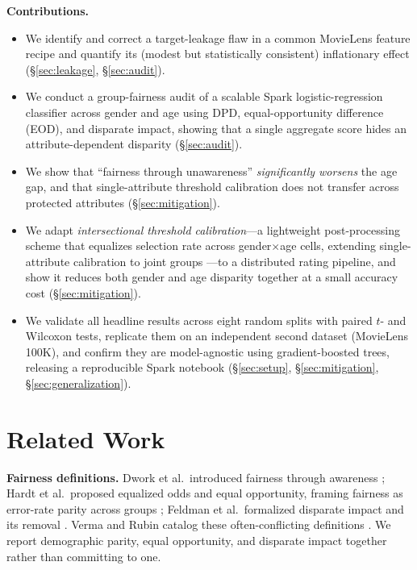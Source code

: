 \documentclass[conference]{IEEEtran}
\begin{document}
\textbf{Contributions.}
\begin{itemize}
  \item We identify and correct a target-leakage flaw in a common MovieLens
  feature recipe and quantify its (modest but statistically consistent) inflationary
  effect (\S\ref{sec:leakage}, \S\ref{sec:audit}).
  \item We conduct a group-fairness audit of a scalable Spark logistic-regression
  classifier across gender and age using DPD, equal-opportunity difference (EOD),
  and disparate impact, showing that a single aggregate score hides an
  attribute-dependent disparity (\S\ref{sec:audit}).
  \item We show that ``fairness through unawareness'' \emph{significantly worsens} the
  age gap, and that single-attribute threshold calibration does not transfer across
  protected attributes (\S\ref{sec:mitigation}).
  \item We adapt \emph{intersectional threshold calibration}---a lightweight
  post-processing scheme that equalizes selection rate across gender$\times$age cells,
  extending single-attribute calibration \cite{hardt2016equality} to joint groups
  \cite{foulds2020intersectional,kearns2018gerrymandering}---to a distributed rating
  pipeline, and show it reduces both gender and age disparity together at a small accuracy
  cost (\S\ref{sec:mitigation}).
  \item We validate all headline results across eight random splits with paired
  $t$- and Wilcoxon tests, replicate them on an independent second dataset
  (MovieLens 100K), and confirm they are model-agnostic using gradient-boosted trees,
  releasing a reproducible Spark notebook
  (\S\ref{sec:setup}, \S\ref{sec:mitigation}, \S\ref{sec:generalization}).
\end{itemize}

\section{Related Work}\label{sec:related}
\textbf{Fairness definitions.} Dwork et al.\ introduced fairness through awareness
\cite{dwork2012fairness}; Hardt et al.\ proposed equalized odds and equal
opportunity, framing fairness as error-rate parity across groups
\cite{hardt2016equality}; Feldman et al.\ formalized disparate impact and its
removal \cite{feldman2015certifying}. Verma and Rubin catalog these often-conflicting
definitions \cite{verma2018fairness}. We report demographic parity, equal
opportunity, and disparate impact together rather than committing to one.
\end{document}
